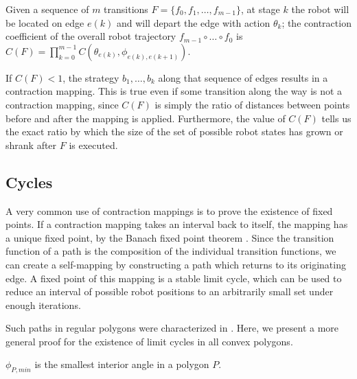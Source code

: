 \documentclass[]{styles/svproc}  %
\begin{document}
\begin{definition}
Given a sequence of $m$ transitions $F = \{f_0, f_1, \ldots, f_{m-1}\}$, at stage $k$ the robot 
will be located on edge $e(k)$ and will depart the edge with
action $\theta_k$; the contraction coefficient of the overall robot
trajectory $f_{m-1} \circ \ldots \circ f_0$ is $C(F) = \prod_{k=0}^{m-1} C(\theta_{e(k)}, \phi_{e(k), e(k+1)})$.
\end{definition}

If $C(F) < 1$, the strategy $b_1, \ldots, b_k$ along that sequence of edges
results in a contraction mapping. This is true even if some transition along
the way is not a
contraction mapping, since $C(F)$ is simply the ratio of distances
between points before and after the mapping is applied. Furthermore, the value
of $C(F)$ tells us the exact ratio by which the
size of the set of possible robot states has grown or shrank after $F$ is
executed.


\subsection{Cycles} \label{sec:cycles}

A very common use of contraction mappings is to prove the existence of fixed
points. If a contraction mapping takes an interval back
to itself, the mapping has a unique fixed point, by the Banach fixed point
theorem \cite{Granas2003}. Since the transition function of a path is the
composition of the individual transition functions, we can create a self-mapping 
by constructing a path which returns to its originating edge. A fixed
point of this mapping is a stable limit cycle, which can be used to reduce an
interval of possible robot positions to an arbitrarily small set under enough
iterations.

Such paths in regular polygons were characterized in \cite{NilBecLav17}.
Here, we present a more general proof for the existence of limit cycles in all
convex polygons.


\begin{definition}
$\phi_{P,min}$ is the smallest interior angle in a polygon $P$.
\end{definition}
\end{document}
